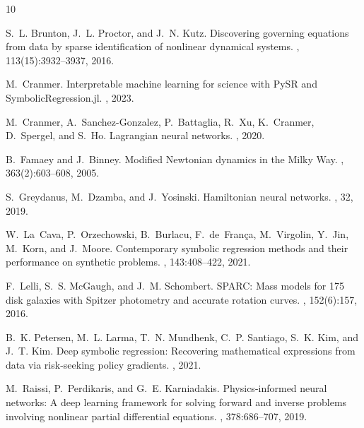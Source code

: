 \documentclass{article}
\begin{document}
\begin{thebibliography}{10}

S.~L. Brunton, J.~L. Proctor, and J.~N. Kutz.
\newblock Discovering governing equations from data by sparse identification of nonlinear dynamical systems.
, 113(15):3932--3937, 2016.

M.~Cranmer.
\newblock Interpretable machine learning for science with PySR and SymbolicRegression.jl.
, 2023.

M.~Cranmer, A.~Sanchez-Gonzalez, P.~Battaglia, R.~Xu, K.~Cranmer, D.~Spergel, and S.~Ho.
\newblock Lagrangian neural networks.
, 2020.

B.~Famaey and J.~Binney.
\newblock Modified Newtonian dynamics in the Milky Way.
, 363(2):603--608, 2005.

S.~Greydanus, M.~Dzamba, and J.~Yosinski.
\newblock Hamiltonian neural networks.
, 32, 2019.

W.~La~Cava, P.~Orzechowski, B.~Burlacu, F.~de~Fran\c{c}a, M.~Virgolin, Y.~Jin, M.~Korn, and J.~Moore.
\newblock Contemporary symbolic regression methods and their performance on synthetic problems.
, 143:408--422, 2021.

F.~Lelli, S.~S. McGaugh, and J.~M. Schombert.
\newblock SPARC: Mass models for 175 disk galaxies with Spitzer photometry and accurate rotation curves.
, 152(6):157, 2016.

B.~K. Petersen, M.~L. Larma, T.~N. Mundhenk, C.~P. Santiago, S.~K. Kim, and J.~T. Kim.
\newblock Deep symbolic regression: Recovering mathematical expressions from data via risk-seeking policy gradients.
, 2021.

M.~Raissi, P.~Perdikaris, and G.~E. Karniadakis.
\newblock Physics-informed neural networks: A deep learning framework for solving forward and inverse problems involving nonlinear partial differential equations.
, 378:686--707, 2019.


\end{thebibliography}
\end{document}
